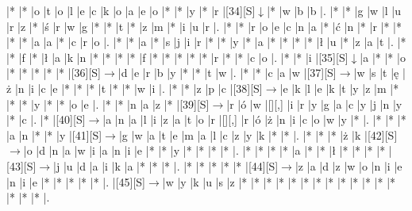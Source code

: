\documentclass[11pt]{article}
\newcommand\rarr{$\rightarrow$}
\newcommand\darr{$\downarrow$}
\begin{document}
\begin{Puzzle}{22}{32}
|*	|*	|o	|t	|o	|l	|e	|c	|k	|o	|a	|e	|o	|*	|*	|y	|*	|r	|[34][S]\darr	|*	|w	|b	|b	|.
|*	|*	|g	|w	|l	|u	|r	|z	|*	|ś	|r	|w	|g	|*	|*	|t	|*	|z	|m	|*	|i	|u	|r	|.
|*	|*	|r	|o	|e	|c	|n	|a	|*	|ć	|n	|*	|r	|*	|*	|*	|*	|a	|a	|*	|c	|r	|o	|.
|*	|*	|a	|*	|s	|j	|i	|r	|*	|*	|y	|*	|a	|*	|*	|*	|*	|ł	|u	|*	|z	|a	|t	|.
|*	|*	|f	|*	|ł	|a	|k	|n	|*	|*	|*	|*	|f	|*	|*	|*	|*	|*	|r	|*	|*	|c	|o	|.
|*	|*	|i	|[35][S]\darr	|a	|*	|*	|o	|*	|*	|*	|*	|*	|[36][S]\rarr	|d	|e	|r	|b	|y	|*	|*	|t	|w	|.
|*	|*	|c	|a	|w	|[37][S]\rarr	|w	|s	|t	|ę	|ż	|n	|i	|c	|e	|*	|*	|*	|t	|*	|*	|w	|i	|.
|*	|*	|z	|p	|c	|[38][S]\rarr	|e	|k	|l	|e	|k	|t	|y	|z	|m	|*	|*	|*	|y	|*	|*	|o	|e	|.
|*	|*	|n	|a	|z	|*	|[39][S]\rarr	|r	|ó	|w	|[][,]{ }	|i	|r	|y	|g	|a	|c	|y	|j	|n	|y	|*	|c	|.
|*	|[40][S]\rarr	|a	|n	|a	|l	|i	|z	|a	|t	|o	|r	|[][,]{ }	|r	|ó	|ż	|n	|i	|c	|o	|w	|y	|*	|.
|*	|*	|*	|a	|n	|*	|*	|y	|[41][S]\rarr	|g	|w	|a	|t	|e	|m	|a	|l	|c	|z	|y	|k	|*	|*	|.
|*	|*	|*	|ż	|k	|[42][S]\rarr	|o	|d	|n	|a	|w	|i	|a	|n	|i	|e	|*	|*	|y	|*	|*	|*	|*	|.
|*	|*	|*	|*	|a	|*	|*	|ł	|*	|*	|*	|*	|[43][S]\rarr	|j	|u	|d	|a	|i	|k	|a	|*	|*	|*	|.
|*	|*	|*	|*	|*	|[44][S]\rarr	|z	|a	|d	|z	|w	|o	|n	|i	|e	|n	|i	|e	|*	|*	|*	|*	|*	|.
|[45][S]\rarr	|w	|y	|k	|u	|s	|z	|*	|*	|*	|*	|*	|*	|*	|*	|*	|*	|*	|*	|*	|*	|*	|*	|.\end{Puzzle}

\newpage
\end{document}
